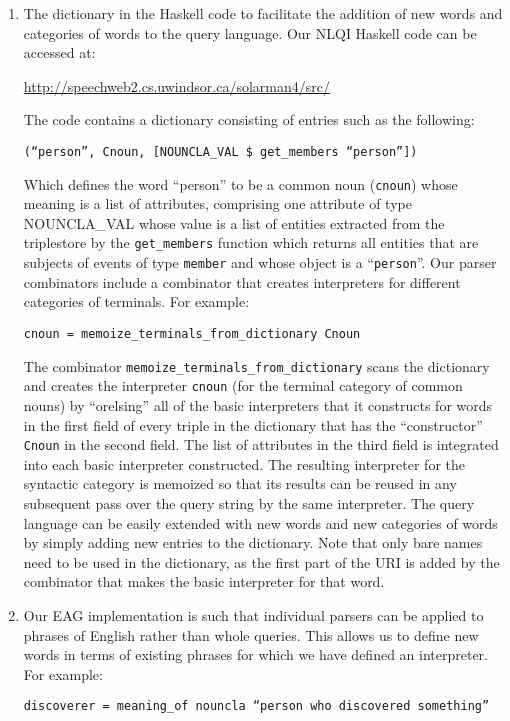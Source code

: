 \documentclass[../main.tex]{subfiles}
\begin{document}
\begin{refsection}
\begin{enumerate}
	\item The dictionary in the Haskell code to facilitate the addition of new words and
	categories of words to the query language. Our NLQI Haskell code can be accessed at:
	\begin{center} \url{http://speechweb2.cs.uwindsor.ca/solarman4/src/} \end{center}
	The code contains a dictionary consisting of entries such as the following:
	\begin{center} \texttt{(``person'', Cnoun, [NOUNCLA\_VAL \$ get\_members ``person''])} \end{center}
	Which defines the word ``person'' to be a common noun (\texttt{cnoun}) whose meaning is a
	list of attributes, comprising one attribute of type NOUNCLA\_VAL whose value is a list of
	entities extracted from the triplestore by the \texttt{get\_members} function which returns all entities
	that are subjects of events of type \texttt{member} and whose object is a ``\texttt{person}''. Our parser
	combinators include a combinator that creates interpreters for different categories of terminals.
	For example:
	\begin{center} \texttt{cnoun = memoize\_terminals\_from\_dictionary Cnoun} \end{center}
	The combinator \texttt{memoize\_terminals\_from\_dictionary} scans the dictionary and
	creates the interpreter \texttt{cnoun} (for the terminal category of common nouns) by ``orelsing''
	all of the basic interpreters that it constructs for words in the first field of every triple in the
	dictionary that has the ``constructor'' \texttt{Cnoun} in the second field. The list of attributes in the
	third field is integrated into each basic interpreter constructed. The resulting interpreter for the
	syntactic category is memoized so that its results can be reused in any subsequent pass over the
	query string by the same interpreter.
	The query language can be easily extended with new words and new categories of words by
	simply adding new entries to the dictionary.
	Note that only bare names need to be used in the dictionary, as the first part of the URI is added
	by the combinator that makes the basic interpreter for that word.
	\item Our EAG implementation is such that individual parsers can be applied to phrases of English
	rather than whole queries. This allows us to define new words in terms of existing phrases for
	which we have defined an interpreter. For example:
	\begin{center} \texttt{discoverer = meaning\_of nouncla ``person who discovered something''} \end{center}


\end{enumerate}
\end{refsection}
\end{document}
